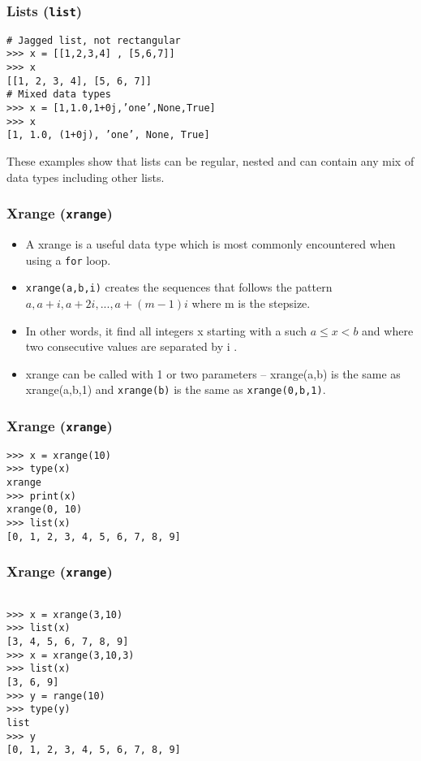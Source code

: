 \documentclass[KSmainSlides.tex]{subfiles}
\begin{document}
\begin{frame}[fragile]
\frametitle{Lists (\texttt{list})}
	\begin{framed}
		\begin{verbatim}
# Jagged list, not rectangular
>>> x = [[1,2,3,4] , [5,6,7]]
>>> x
[[1, 2, 3, 4], [5, 6, 7]]
# Mixed data types
>>> x = [1,1.0,1+0j,’one’,None,True]
>>> x
[1, 1.0, (1+0j), ’one’, None, True]
\end{verbatim}
\end{framed}
These examples show that lists can be regular, nested and can contain any mix of data types including
other lists.
\end{frame}
\begin{frame}[fragile]

\frametitle{Xrange (\texttt{xrange})}
\begin{itemize}
\item A xrange is a useful data type which is most commonly encountered when using a \texttt{for} loop. 
\item 
\texttt{xrange(a,b,i)}
creates the sequences that follows the pattern $a, a +i , a +2i , . . . , a +(m -1)i$ where m is the stepsize.
\item In other
words, it find all integers x starting with a such $a \leq x < b$ and where two consecutive values are separated
by i . \item 
xrange can be called with 1 or two parameters – xrange(a,b) is the same as xrange(a,b,1)
and \texttt{xrange(b)} is the same as \texttt{xrange(0,b,1)}.
\end{itemize}
\end{frame}
\begin{frame}[fragile]

\frametitle{Xrange (\texttt{xrange})}
\begin{framed}
\begin{verbatim}
>>> x = xrange(10)
>>> type(x)
xrange
>>> print(x)
xrange(0, 10)
>>> list(x)
[0, 1, 2, 3, 4, 5, 6, 7, 8, 9]

\end{verbatim}
\end{framed}
\end{frame}
\begin{frame}[fragile]

\frametitle{Xrange (\texttt{xrange})}
\begin{framed}
\begin{verbatim}

>>> x = xrange(3,10)
>>> list(x)
[3, 4, 5, 6, 7, 8, 9]
>>> x = xrange(3,10,3)
>>> list(x)
[3, 6, 9]
>>> y = range(10)
>>> type(y)
list
>>> y
[0, 1, 2, 3, 4, 5, 6, 7, 8, 9]
\end{verbatim}
\end{framed}
\end{frame}
\end{document}
